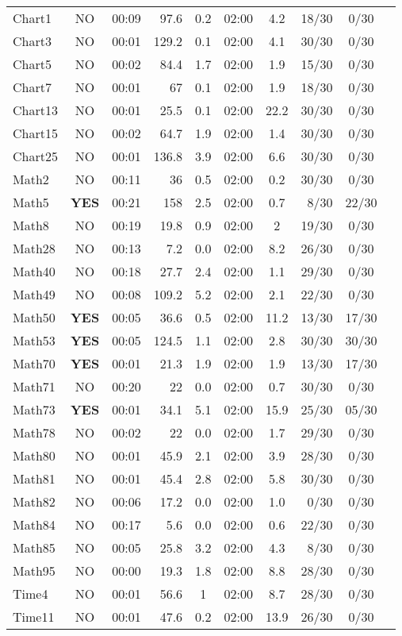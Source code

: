 \documentclass[]{sig-alternate}
\begin{document}
\begin{table}[h]
{\begin{tabular}{|l|c|c|r|c|c|c|r|c|r|}
Chart1 & NO & 00:09 & 97.6 & 0.2  & 02:00 &4.2  & 18/30 & 0/30 \\ 
Chart3 & NO & 00:01 &  129.2 & 0.1  & 02:00 & 4.1 & 30/30 & 0/30 \\ 
Chart5 & NO & 00:02 &  84.4 & 1.7  & 02:00 & 1.9 & 15/30 & 0/30 \\ 
Chart7 & NO & 00:01 &  67 & 0.1  & 02:00 & 1.9 & 18/30 & 0/30 \\ 
Chart13 & NO & 00:01 &  25.5 & 0.1  & 02:00 &22.2 & 30/30 & 0/30 \\ 
Chart15 & NO & 00:02 &  64.7 & 1.9  & 02:00 &  1.4& 30/30 & 0/30 \\ 
Chart25 & NO & 00:01 & 136.8 & 3.9  & 02:00 & 6.6 & 30/30 & 0/30 \\ 
Math2  & NO & 00:11 &  36 & 0.5  & 02:00 & 0.2 & 30/30 & {0/30} \\ 
Math5  & \bf{YES}& 00:21 & 158 & 2.5  & 02:00 & 0.7 & 8/30 & {22/30} \\ 
Math8  & NO & 00:19 &  19.8 & 0.9  & 02:00 & 2 & 19/30 & 0/30 \\ 
Math28 & NO & 00:13 &   7.2 & 0.0  & 02:00 & 8.2 & 26/30 & 0/30 \\ 
Math40 & NO & 00:18 &  27.7 & 2.4  & 02:00 & 1.1 & 29/30 & 0/30 \\ 
Math49 & NO & 00:08 &  109.2 & 5.2  & 02:00 & 2.1 & 22/30 & 0/30 \\ 
Math50 & \bf{YES}& 00:05 &  36.6 & 0.5  & 02:00 & 11.2 & 13/30 & {17/30} \\ 
Math53 & \bf{YES}& 00:05 & 124.5 & 1.1  & 02:00 & 2.8 & 30/30  &{30/30} \\ 
Math70 & \bf{YES}& 00:01 &  21.3 & 1.9  & 02:00 & 1.9 & 13/30 & 17/30\\ 
Math71 & NO & 00:20 &  22 & 0.0  & 02:00 & 0.7 & 30/30 & 0/30 \\ 
Math73 & \bf{YES}& 00:01 &  34.1 & 5.1  & 02:00 & 15.9 & 25/30 & 05/30 \\ 
Math78 & NO & 00:02 &  22 & 0.0  & 02:00 & 1.7 & 29/30 & 0/30 \\ 
Math80 & NO & 00:01 &  45.9 & 2.1  & 02:00 & 3.9 & 28/30 & 0/30 \\ 
Math81 & NO & 00:01 &  45.4 & 2.8  & 02:00 & 5.8 & 30/30 & 0/30 \\ 
Math82 & NO & 00:06 &  17.2 & 0.0  & 02:00 & 1.0 & 0/30 & 0/30 \\ 
Math84 & NO & 00:17 &   5.6 & 0.0  & 02:00 & 0.6 & 22/30 & 0/30 \\ 
Math85 & NO & 00:05 &  25.8 & 3.2  & 02:00 & 4.3 & 8/30 & 0/30 \\ 
Math95 & NO & 00:00 &  19.3 & 1.8  & 02:00 & 8.8 & 28/30 & 0/30 \\ 
Time4  & NO & 00:01 &  56.6 & 1  & 02:00 & 8.7 & 28/30 & 0/30 \\ 
Time11 & NO & 00:01 &  47.6 & 0.2  & 02:00 & 13.9 & 26/30 & 0/30 \\ 
\hline
\end{tabular}
}

\end{table}
\end{document}
